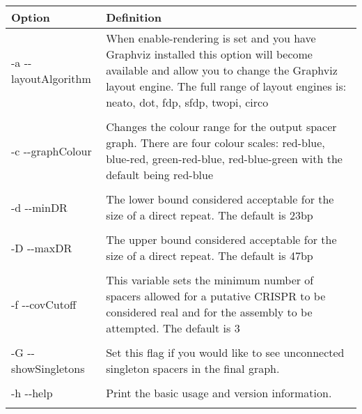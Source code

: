 \documentclass[11pt]{article} %
\begin{document}
    \begin{longtable}{  l   p{10cm} }
    \hline
    Option & Definition \\  \hline\hline
    -a  -{}-layoutAlgorithm &   When enable-rendering is set and you have Graphviz installed this option will become available and allow you to change the Graphviz layout engine.  The full range of layout engines is: neato, dot, fdp, sfdp, twopi, circo \\ \\
-c -{}-graphColour & Changes the colour range for the output spacer graph.  There are four colour scales: red-blue, blue-red, green-red-blue, red-blue-green with the default being red-blue\\ \\
-d -{}-minDR & The lower bound considered acceptable for the size of a direct repeat.  The default is 23bp\\ \\
-D -{}-maxDR & The upper bound considered acceptable for the size of a direct repeat. The default is 47bp\\ \\
-f -{}-covCutoff & This variable sets the minimum number of spacers allowed for a putative CRISPR to be considered real and for the assembly to be attempted.  The default is 3  \\ \\
-G -{}-showSingletons & Set this flag if you would like to see unconnected singleton spacers in the final graph.\\ \\
-h -{}-help & Print the basic usage and version information. \\ \\


\end{longtable}
\end{document}
